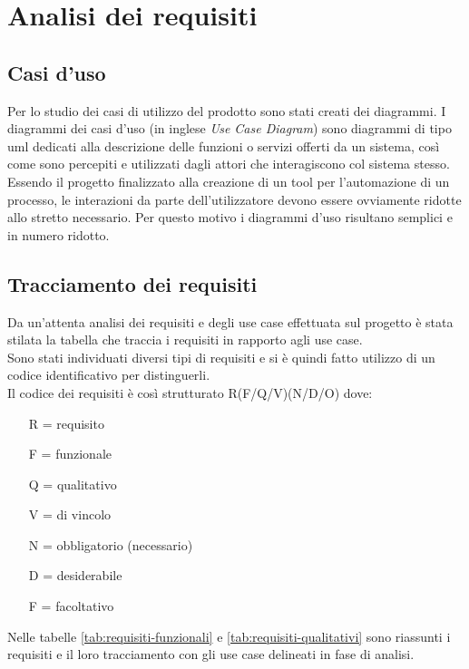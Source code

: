 
\chapter{Analisi dei requisiti}
\label{cap:analisi-requisiti}


\section{Casi d'uso}

Per lo studio dei casi di utilizzo del prodotto sono stati creati dei diagrammi.
I diagrammi dei casi d'uso (in inglese \emph{Use Case Diagram}) sono diagrammi di tipo \gls{uml} dedicati alla descrizione delle funzioni o servizi offerti da un sistema, così come sono percepiti e utilizzati dagli attori che interagiscono col sistema stesso.
Essendo il progetto finalizzato alla creazione di un tool per l'automazione di un processo, le interazioni da parte dell'utilizzatore devono essere ovviamente ridotte allo stretto necessario. Per questo motivo i diagrammi d'uso risultano semplici e in numero ridotto.
\newpage








\section{Tracciamento dei requisiti}

Da un'attenta analisi dei requisiti e degli use case effettuata sul progetto è stata stilata la tabella che traccia i requisiti in rapporto agli use case.\\
Sono stati individuati diversi tipi di requisiti e si è quindi fatto utilizzo di un codice identificativo per distinguerli.\\
Il codice dei requisiti è così strutturato R(F/Q/V)(N/D/O) dove:
\begin{enumerate}
  \item[R =] requisito
  \item[F =] funzionale
  \item[Q =] qualitativo
  \item[V =] di vincolo
  \item[N =] obbligatorio (necessario)
  \item[D =] desiderabile
  \item[F =] facoltativo
\end{enumerate}
Nelle tabelle \ref{tab:requisiti-funzionali} e \ref{tab:requisiti-qualitativi} sono riassunti i requisiti e il loro tracciamento con gli use case delineati in fase di analisi.

